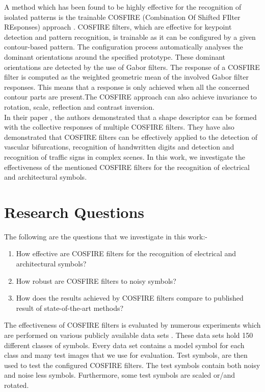 A method which has been found to be highly effective for the recognition of isolated patterns is the trainable COSFIRE (Combination Of Shifted FIlter REsponses) approach \cite{Azzopardi_Petkov_2012}. COSFIRE filters, which are effective for keypoint detection and pattern recognition, is trainable as it can be configured by a given contour-based pattern. The configuration process automatically analyses the dominant orientations around the specified prototype. These dominant orientations are detected by the use of Gabor filters. The response of a COSFIRE filter is computed as the weighted geometric mean of the involved Gabor filter responses. This means that a response is only achieved when all the concerned contour parts are present.The COSFIRE approach can also achieve invariance to rotation, scale, reflection and contrast inversion. \\

In their paper \cite{Azzopardi_Petkov_2012}, the authors demonstrated that a shape descriptor can be formed with the collective responses of multiple COSFIRE filters. They have also demonstrated that COSFIRE filters can be effectively applied to the detection of vascular bifurcations, recognition of handwritten digits and detection and recognition of traffic signs in complex scenes. In this work, we investigate the effectiveness of the mentioned COSFIRE filters for the recognition of electrical and architectural symbols.
    
\section {Research Questions} 
The following are the questions that we investigate in this work:-
    \begin{enumerate}
        \item How effective are COSFIRE filters for the recognition of electrical and architectural symbols?
        \item How robust are COSFIRE filters to noisy symbols?
        \item How does the results achieved by COSFIRE filters compare to published result of state-of-the-art methods?
    \end{enumerate}

The effectiveness of COSFIRE filters is evaluated by numerous experiments which are performed on various publicly available data sets \cite{Delalandre_contest} \cite{Delalandre_sketched}. These data sets hold 150 different classes of symbols. Every data set contains a model symbol for each class and many test images that we use for evaluation. Test symbols, are then used to test the configured COSFIRE filters. The test symbols contain both noisy and noise less symbols. Furthermore, some test symbols are scaled or/and rotated.


